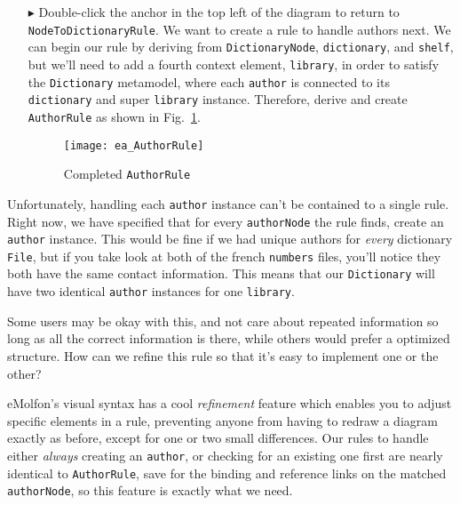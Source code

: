 \begin{itemize}
\item[$\blacktriangleright$] Double-click the anchor in the top left of the diagram to return to \texttt{NodeToDictionaryRule}. We want to create a rule to
handle authors next. We can begin our rule by deriving from \texttt{DictionaryNode}, \texttt{dictionary}, and \texttt{shelf}, but we'll need to add a fourth
context element, \texttt{library}, in order to satisfy the \texttt{Dictionary} metamodel, where each \texttt{author} is connected to its \texttt{dictionary} and
super \texttt{library} instance. Therefore, derive and create \texttt{AuthorRule} as shown in Fig.~\ref{ea:AuthorRule}.

\newpage

\begin{figure}[h]
  \hspace{-2cm}
  \texttt{[image: ea\_AuthorRule]}
  \caption{Completed \texttt{AuthorRule}}
  \label{ea:AuthorRule}
\end{figure}

\end{itemize}

Unfortunately, handling each \texttt{author} instance can't be contained to a single rule. Right now, we have specified that for every \texttt{authorNode} the
rule finds, create an \texttt{author} instance. This would be fine if we had unique authors for \emph{every} dictionary \texttt{File}, but if you take look at
both of the french \texttt{numbers} files, you'll notice they both have the same contact information. This means that our \texttt{Dictionary} will have two
identical \texttt{author} instances for one \texttt{library}.

Some users may be okay with this, and not care about repeated information so long as all the correct information is there, while others would prefer a
optimized structure. How can we refine this rule so that it's easy to implement one or the other?

eMolfon's visual syntax has a cool \emph{refinement} feature which enables you to adjust specific elements in a rule, preventing anyone from having to redraw a
diagram exactly as before, except for one or two small differences. Our rules to handle either \emph{always} creating an \texttt{author}, or checking for an
existing one first are nearly identical to \texttt{AuthorRule}, save for the binding and reference links on the matched \texttt{authorNode}, so this feature is
exactly what we need.


